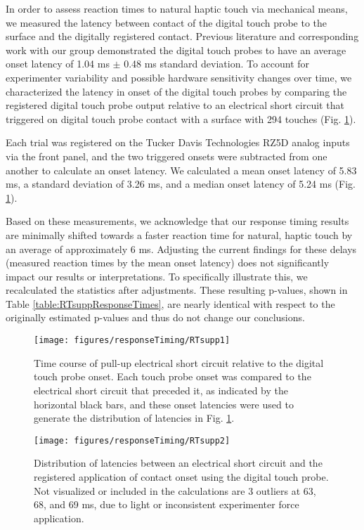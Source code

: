 In order to assess reaction times to natural haptic touch via mechanical means, we measured the latency between contact of the digital touch probe to the surface and the digitally registered contact. Previous literature \cite{Collins2016} and corresponding work with our group demonstrated the digital touch probes to have an average onset latency of 1.04 ms $\pm$ 0.48 ms standard deviation. To account for experimenter variability and possible hardware sensitivity changes over time, we characterized the latency in onset of the digital touch probes by comparing the registered digital touch probe output relative to an electrical short circuit that triggered on digital touch probe contact with a surface with 294 touches (Fig. \ref{fig:RTsupp1}). 

Each trial was registered on the Tucker Davis Technologies RZ5D analog inputs via the front panel, and the two triggered onsets were subtracted from one another to calculate an onset latency. We calculated a mean onset latency of 5.83 ms, a standard deviation of 3.26 ms, and a median onset latency of 5.24 ms (Fig. \ref{fig:RTsupp1}). 

Based on these measurements, we acknowledge that our response timing results are minimally shifted towards a faster reaction time for natural, haptic touch by an average of approximately 6 ms. Adjusting the current findings for these delays (measured reaction times by the mean onset latency) does not significantly impact our results or interpretations. To specifically illustrate this, we recalculated the statistics after adjustments. These resulting p-values, shown in Table \ref{table:RTsuppResponseTimes}, are nearly identical with respect to the originally estimated p-values and thus do not change our conclusions.

\begin{figure}[h]
	\centering
	\texttt{[image: figures/responseTiming/RTsupp1]}
	\caption[Example electrical short circuit and digital touch probe signal traces. ]{Time course of pull-up electrical short circuit relative to the digital touch probe onset. Each touch probe onset was compared to the electrical short circuit that preceded it, as indicated by the horizontal black bars, and these onset latencies were used to generate the distribution of latencies in Fig. \ref{fig:RTsupp1}.}
	\label{fig:RTsupp1}
\end{figure}

\begin{figure}[h]
	\centering
	\texttt{[image: figures/responseTiming/RTsupp2]}
	\caption[Distribution of onset delays.]{Distribution of latencies between an electrical short circuit and the registered application of contact onset using the digital touch probe. Not visualized or included in the calculations are 3 outliers at 63, 68, and 69 ms, due to light or inconsistent experimenter force application.}
	\label{fig:RTsupp2}
\end{figure}

